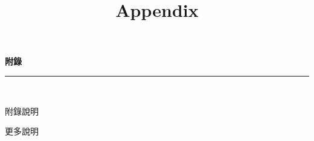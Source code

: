 \documentclass[a4paper]{article}
\title{Appendix}
\begin{document}
\begin{center}
\textbf{\huge 附錄}\\
\vspace{5mm}


\rule{17cm}{2pt}\\
\vspace{7mm}

\huge 附錄說明\\
\end{center}

\fontsize{14pt}{20pt}\selectfont
更多說明
\end{document}
